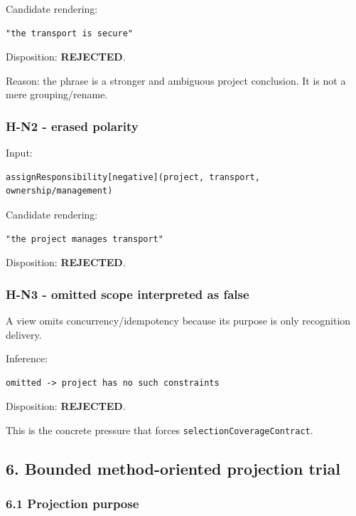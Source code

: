 \documentclass[11pt,a4paper]{article}
\begin{document}
Candidate rendering:

\begin{verbatim}
"the transport is secure"
\end{verbatim}

Disposition: \textbf{REJECTED}.

Reason: the phrase is a stronger and ambiguous project conclusion. It is not a mere grouping/rename.

\subsubsection{H-N2 - erased polarity}\label{h-n2---erased-polarity}

Input:

\begin{verbatim}
assignResponsibility[negative](project, transport, ownership/management)
\end{verbatim}

Candidate rendering:

\begin{verbatim}
"the project manages transport"
\end{verbatim}

Disposition: \textbf{REJECTED}.

\subsubsection{H-N3 - omitted scope interpreted as false}\label{h-n3---omitted-scope-interpreted-as-false}

A view omits concurrency/idempotency because its purpose is only recognition delivery.

Inference:

\begin{verbatim}
omitted -> project has no such constraints
\end{verbatim}

Disposition: \textbf{REJECTED}.

This is the concrete pressure that forces \texttt{selectionCoverageContract}.

\subsection{6. Bounded method-oriented projection trial}\label{6-bounded-method-oriented-projection-trial}

\subsubsection{6.1 Projection purpose}\label{61-projection-purpose}
\end{document}
